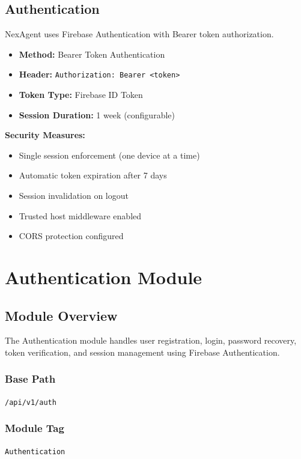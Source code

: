 \documentclass[11pt,a4paper]{report}
\begin{document}
\section{Authentication}

NexAgent uses Firebase Authentication with Bearer token authorization.

\begin{itemize}[leftmargin=*]
    \item \textbf{Method:} Bearer Token Authentication
    \item \textbf{Header:} \texttt{Authorization: Bearer <token>}
    \item \textbf{Token Type:} Firebase ID Token
    \item \textbf{Session Duration:} 1 week (configurable)
\end{itemize}

\begin{infobox}
\textbf{Security Measures:}
\begin{itemize}[leftmargin=*]
    \item Single session enforcement (one device at a time)
    \item Automatic token expiration after 7 days
    \item Session invalidation on logout
    \item Trusted host middleware enabled
    \item CORS protection configured
\end{itemize}
\end{infobox}

\newpage

\chapter{Authentication Module}

\section{Module Overview}

The Authentication module handles user registration, login, password recovery, token verification, and session management using Firebase Authentication.

\subsection{Base Path}
\texttt{/api/v1/auth}

\subsection{Module Tag}
\texttt{Authentication}
\end{document}
